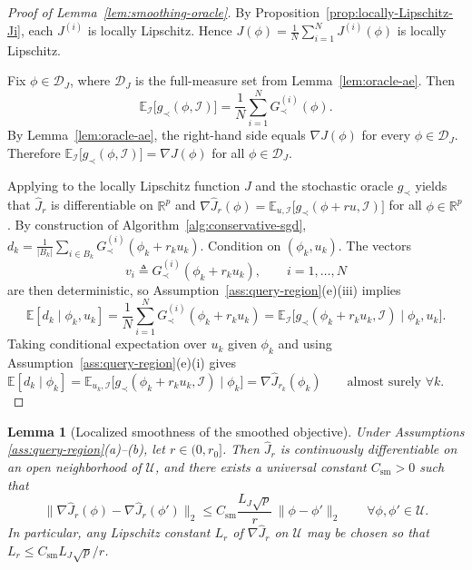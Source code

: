 \documentclass[11pt, letterpaper, oneside, reqno]{amsart}
\newcommand{\R}{\mathbb{R}}
\newcommand{\Let}{\triangleq}
\newtheorem{lemma}{Lemma}
\begin{document}
\begin{proof}[Proof of Lemma~\ref{lem:smoothing-oracle}]
By Proposition~\ref{prop:locally-Lipschitz-Ji}, each $J^{(i)}$ is locally Lipschitz. Hence
$J(\phi)=\frac1N\sum_{i=1}^N J^{(i)}(\phi)$
is locally Lipschitz.

Fix $\phi\in\mathcal D_J$, where $\mathcal D_J$ is the full-measure set from Lemma~\ref{lem:oracle-ae}.
Then
\[
\mathbb E_{\mathcal I}\big[g_\prec(\phi,\mathcal I)\big]
= \frac1N\sum_{i=1}^N G^{(i)}_{\prec}(\phi).
\]
By Lemma~\ref{lem:oracle-ae}, the right-hand side equals $\nabla J(\phi)$ for every $\phi\in\mathcal D_J$. Therefore
$\mathbb E_{\mathcal I}\big[g_\prec(\phi,\mathcal I)\big]=\nabla J(\phi)$ for all $\phi\in\mathcal D_J$.

Applying \cite[Proposition~2]{ref:cutkosky2023optimal} to the locally Lipschitz function $J$ and the stochastic oracle $g_\prec$ yields that $\hat J_r$ is differentiable on $\R^p$ and
$\nabla \hat J_r(\phi)
= \mathbb E_{u,\mathcal I}\big[g_\prec(\phi+r u,\mathcal I)\big]$ for all $\phi\in\R^p$.
By construction of Algorithm~\ref{alg:conservative-sgd},
$d_k=\frac1{|B_k|}\sum_{i\in B_k} G^{(i)}_{\prec}(\phi_k+r_k u_k)$.
Condition on $(\phi_k,u_k)$. The vectors
\[
v_i \Let G^{(i)}_{\prec}(\phi_k+r_k u_k),\qquad i=1,\dots,N
\]
are then deterministic, so Assumption~\ref{ass:query-region}(e)(iii) implies
\[
\mathbb E[d_k\mid \phi_k,u_k]
= \frac1N\sum_{i=1}^N G^{(i)}_{\prec}(\phi_k+r_k u_k)
= \mathbb E_{\mathcal I}\big[g_\prec(\phi_k+r_k u_k,\mathcal I)\mid \phi_k,u_k\big].
\]
Taking conditional expectation over $u_k$ given $\phi_k$ and using Assumption~\ref{ass:query-region}(e)(i) gives
\[
\mathbb E[d_k\mid \phi_k]
= \mathbb E_{u_k,\mathcal I}\big[g_\prec(\phi_k+r_k u_k,\mathcal I)\mid \phi_k\big]
= \nabla \hat J_{r_k}(\phi_k)
\qquad \text{almost surely } \forall k.
\qquad
\]
\end{proof}


\begin{lemma}[Localized smoothness of the smoothed objective]
\label{lem:smoothing-smoothness}
Under Assumptions \ref{ass:query-region}(a)--(b), let $r\in(0,r_0]$.
Then $\hat J_r$ is continuously differentiable on an open neighborhood of $\mathcal U$, and there exists a universal constant $C_{\mathrm{sm}}>0$ such that
\[
\|\nabla \hat J_r(\phi)-\nabla \hat J_r(\phi')\|_2
\le C_{\mathrm{sm}}\frac{L_J\sqrt p}{r}\,\|\phi-\phi'\|_2
\qquad \forall \phi,\phi'\in\mathcal U.
\]
In particular, any Lipschitz constant $L_r$ of $\nabla \hat J_r$ on $\mathcal U$ may be chosen so that
$L_r \le C_{\mathrm{sm}}L_J\sqrt p / r$.
\end{lemma}
\end{document}
